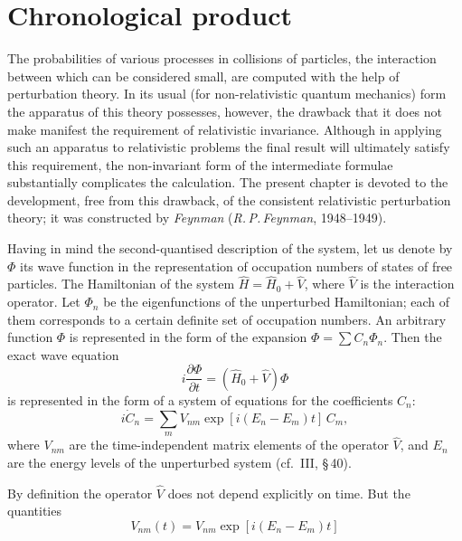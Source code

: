 \section{Chronological product}

The probabilities of various processes in collisions of particles, the interaction between which can be considered small, are computed with the help of perturbation theory. In its usual (for non-relativistic quantum mechanics) form the apparatus of this theory possesses, however, the drawback that it does not make manifest the requirement of relativistic invariance. Although in applying such an apparatus to relativistic problems the final result will ultimately satisfy this requirement, the non-invariant form of the intermediate formulae substantially complicates the calculation. The present chapter is devoted to the development, free from this drawback, of the consistent relativistic perturbation theory; it was constructed by \textit{Feynman} (\textit{R.\,P.\,Feynman}, 1948--1949).

Having in mind the second-quantised description of the system, let us denote by $\Phi$ its wave function in the representation of occupation numbers of states of free particles. The Hamiltonian of the system $\hat{H} = \hat{H}_0 + \hat{V}$, where $\hat{V}$ is the interaction operator.
Let $\Phi_n$ be the eigenfunctions of the unperturbed Hamiltonian; each of them corresponds to a certain definite set of occupation numbers. An arbitrary function $\Phi$ is represented in the form of the expansion $\Phi = \sum C_n \Phi_n$. Then the exact wave equation
\begin{equation}
i\frac{\partial\Phi}{\partial t} = (\hat{H}_0 + \hat{V})\Phi
\tag{72.1}
\end{equation}
is represented in the form of a system of equations for the coefficients $C_n$:
\begin{equation}
i\dot{C}_n = \sum_m V_{nm}\exp[i(E_n - E_m)t]\,C_m,
\tag{72.2}
\end{equation}
where $V_{nm}$ are the time-independent matrix elements of the operator $\hat{V}$, and $E_n$ are the energy levels of the unperturbed system (cf.~III, \S\,40).

By definition the operator $\hat{V}$ does not depend explicitly on time. But the quantities
\begin{equation}
V_{nm}(t) = V_{nm}\exp[i(E_n - E_m)t]
\tag{72.3}
\end{equation}

